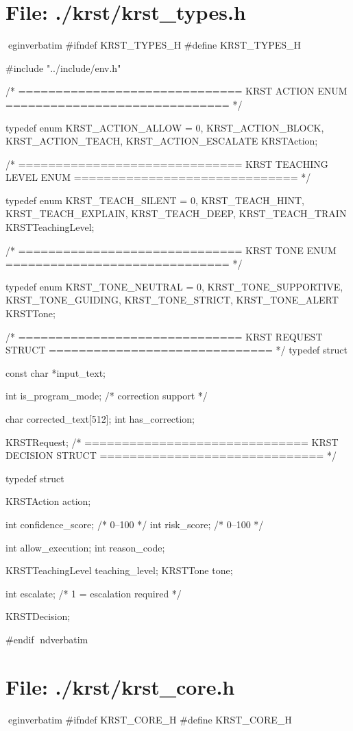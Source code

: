 \documentclass{article}
\begin{document}
\section*{File: ./krst/krst_types.h}
egin{verbatim}
#ifndef KRST_TYPES_H
#define KRST_TYPES_H

#include "../include/env.h"

/* ==============================
   KRST ACTION ENUM
============================== */

typedef enum {
    KRST_ACTION_ALLOW = 0,
    KRST_ACTION_BLOCK,
    KRST_ACTION_TEACH,
    KRST_ACTION_ESCALATE
} KRSTAction;

/* ==============================
   KRST TEACHING LEVEL ENUM
============================== */

typedef enum {
    KRST_TEACH_SILENT = 0,
    KRST_TEACH_HINT,
    KRST_TEACH_EXPLAIN,
    KRST_TEACH_DEEP,
    KRST_TEACH_TRAIN
} KRSTTeachingLevel;

/* ==============================
   KRST TONE ENUM
============================== */

typedef enum {
    KRST_TONE_NEUTRAL = 0,
    KRST_TONE_SUPPORTIVE,
    KRST_TONE_GUIDING,
    KRST_TONE_STRICT,
    KRST_TONE_ALERT
} KRSTTone;

/* ==============================
   KRST REQUEST STRUCT
============================== */
typedef struct
{
    const char *input_text;

     int is_program_mode;
    /* correction support */

    char corrected_text[512];
    int has_correction;

} KRSTRequest;
/* ==============================
   KRST DECISION STRUCT
============================== */

typedef struct {
    KRSTAction action;

    int confidence_score;   /* 0–100 */
    int risk_score;         /* 0–100 */

    int allow_execution;
    int reason_code;

    KRSTTeachingLevel teaching_level;
    KRSTTone tone;

    int escalate;   /* 1 = escalation required */

} KRSTDecision;

#endif
nd{verbatim}
\section*{File: ./krst/krst_core.h}
egin{verbatim}
#ifndef KRST_CORE_H
#define KRST_CORE_H
\end{document}
